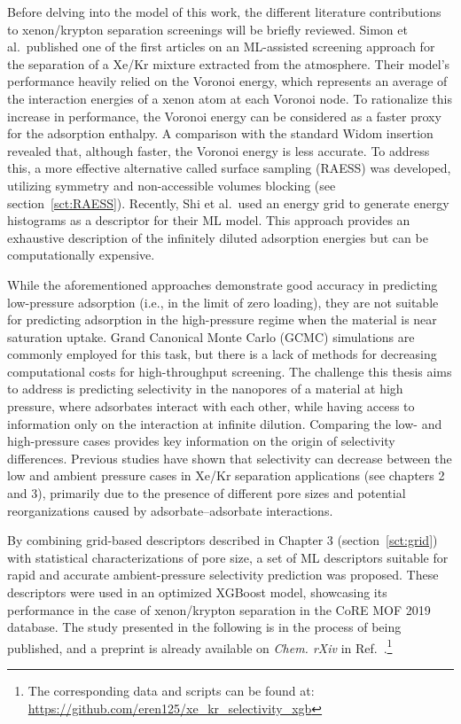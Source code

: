 \documentclass[main]{subfiles}
\begin{document}
Before delving into the model of this work, the different literature contributions to xenon/krypton separation screenings will be briefly reviewed. Simon et al.\ published one of the first articles on an ML-assisted screening approach for the separation of a Xe/Kr mixture extracted from the atmosphere.\autocite{Simon_2015} Their model's performance heavily relied on the Voronoi energy, which represents an average of the interaction energies of a xenon atom at each Voronoi node.\autocite{Rycroft_2009} To rationalize this increase in performance, the Voronoi energy can be considered as a faster proxy for the adsorption enthalpy. A comparison with the standard Widom insertion revealed that, although faster, the Voronoi energy is less accurate. To address this, a more effective alternative called surface sampling (RAESS) was developed, utilizing symmetry and non-accessible volumes blocking (see section~\ref{sct:RAESS}). Recently, Shi et al.\ used an energy grid to generate energy histograms as a descriptor for their ML model. This approach provides an exhaustive description of the infinitely diluted adsorption energies\autocite{Shi_2023} but can be computationally expensive.

While the aforementioned approaches demonstrate good accuracy in predicting low-pressure adsorption (i.e., in the limit of zero loading), they are not suitable for predicting adsorption in the high-pressure regime when the material is near saturation uptake. Grand Canonical Monte Carlo (GCMC) simulations are commonly employed for this task, but there is a lack of methods for decreasing computational costs for high-throughput screening. The challenge this thesis aims to address is predicting selectivity in the nanopores of a material at high pressure, where adsorbates interact with each other, while having access to information only on the interaction at infinite dilution. Comparing the low- and high-pressure cases provides key information on the origin of selectivity differences. Previous studies have shown that selectivity can decrease between the low and ambient pressure cases in Xe/Kr separation applications (see chapters 2 and 3), primarily due to the presence of different pore sizes and potential reorganizations caused by adsorbate--adsorbate interactions.

By combining grid-based descriptors described in Chapter 3 (section~\ref{sct:grid}) with statistical characterizations of pore size, a set of ML descriptors suitable for rapid and accurate ambient-pressure selectivity prediction was proposed. These descriptors were used in an optimized XGBoost model, showcasing its performance in the case of xenon/krypton separation in the CoRE MOF 2019 database\autocite{Chung_2019}. The study presented in the following is in the process of being published, and a preprint is already available on \emph{Chem. rXiv} in Ref.~\cite{Ren_2023_ml}.\footnote[1]{The corresponding data and scripts can be found at: \url{https://github.com/eren125/xe_kr_selectivity_xgb} }
\end{document}
